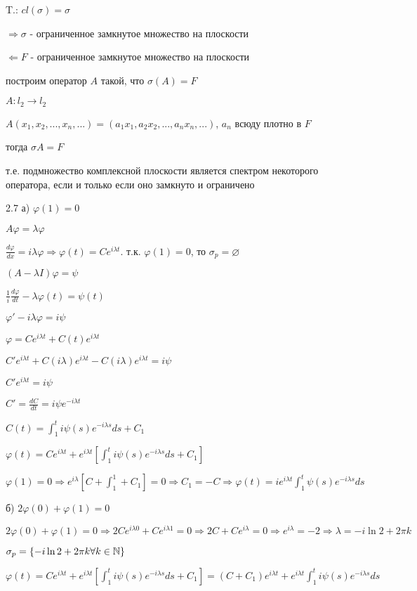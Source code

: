 \documentclass[russian]{article}
\begin{document}
T.: $cl(\sigma) = \sigma$

$\Rightarrow \sigma $ - ограниченное замкнутое множество на плоскости

$\Leftarrow F $ - ограниченное замкнутое множество на плоскости

построим оператор $A$ такой, что $\sigma(A) = F$

$A:l_2 \to l_2$

$A(x_1, x_2, ..., x_n, ...) = (a_1 x_1, a_2 x_2, ..., a_n x_n, ...)$, $a_n$ всюду плотно в $F$

тогда $\sigma A = F$

т.е. подмножество комплексной плоскости является спектром некоторого оператора, если и только если оно замкнуто и ограничено

2.7 а) $\varphi (1) = 0$

$A \varphi = \lambda \varphi$

$\frac{d\varphi}{dx} = i\lambda \varphi \Rightarrow \varphi(t) = C e^{i\lambda t}$. т.к. $\varphi (1) = 0$, то $\sigma_p = \varnothing$

$(A- \lambda I)\varphi = \psi$

$\frac{1}{i}\frac{d\varphi}{dt} - \lambda \varphi(t) = \psi(t)$

$\varphi'-i \lambda \varphi = i \psi$

$\varphi = C e^{i \lambda t} + C(t)e^{i \lambda t}$

$C'e^{i\lambda t} + C(i \lambda) e ^ {i \lambda t} - C(i \lambda) e ^ {i \lambda t} = i \psi$

$C'e^{i\lambda t} = i \psi$

$C' = \frac{dC}{dt}=i\psi e^{-i \lambda t}$

$C(t) = \int _1^t i\psi(s)e^{-i\lambda s}ds + C_1$

$\varphi(t) = Ce^{i \lambda t} + e ^ {i \lambda t} [ \int _1^t i\psi(s) e ^{-i \lambda s}ds + C_1]$

$\varphi(1) = 0 \Rightarrow e^{i \lambda} [C + \int_1^1 + C_1] = 0 \Rightarrow C_1 = -C \Rightarrow \varphi(t) = ie^{i\lambda t} \int_1^t\psi(s)e^{-i 
\lambda s} ds$

б) $2\varphi(0)+\varphi(1) = 0$

$2\varphi(0)+\varphi(1) = 0 \Rightarrow 2 C e^{i \lambda 0} + C e^{i \lambda 1} = 0 \Rightarrow 2 C + C e^{i \lambda} = 0 \Rightarrow e^{i \lambda} = -2 \Rightarrow \lambda = -i \ln 2 + 2\pi k$

$\sigma_p = \{-i \ln 2 + 2\pi k \forall k \in \Bbb N\}$

$\varphi(t) = Ce^{i \lambda t} + e ^ {i \lambda t} [ \int _1^t i\psi(s) e ^{-i \lambda s}ds + C_1] = (C + C_1)e^{i \lambda t} + e ^ {i \lambda t} \int _1^t i\psi(s) e ^{-i \lambda s}ds$
\end{document}
